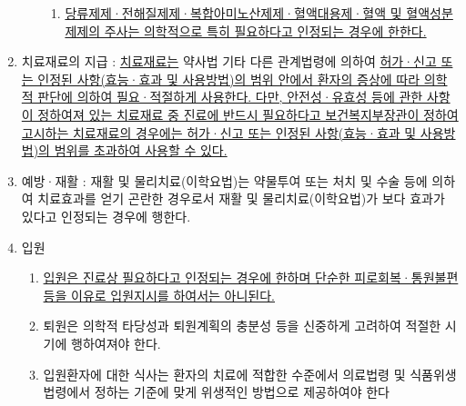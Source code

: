 \begin{enumerate}[1.]
\begin{enumerate}[가.]
\begin{enumerate}[(1)]
		\item \uline{당류제제·전해질제제·복합아미노산제제·혈액대용제·혈액 및 혈액성분제제의 주사는 의학적으로 특히 필요하다고 인정되는 경우에 한한다.}
		\end{enumerate}
	\end{enumerate}
\item 치료재료의 지급 : 
\uline{치료재료는} 약사법 기타 다른 관계법령에 의하여 \uline{허가·신고 또는 인정된 사항(효능·효과 및 사용방법)의 범위 안에서 환자의 증상에 따라 의학적 판단에 의하여 필요·적절하게 사용한다. 다만, 안전성·유효성 등에 관한 사항이 정하여져 있는 치료재료 중 진료에 반드시 필요하다고 보건복지부장관이 정하여 고시하는 치료재료의 경우에는 허가·신고 또는 인정된 사항(효능·효과 및 사용방법)의 범위를 초과하여 사용할 수 있다.}
\item 예방·재활 : 
재활 및 물리치료(이학요법)는 약물투여 또는 처치 및 수술 등에 의하여 치료효과를 얻기 곤란한 경우로서 재활 및 물리치료(이학요법)가 보다 효과가 있다고 인정되는 경우에 행한다.
\item 입원
	\begin{enumerate}[가.]\tightlist
	\item \uline{입원은 진료상 필요하다고 인정되는 경우에 한하며 단순한 피로회복·통원불편 등을 이유로 입원지시를 하여서는 아니된다.}
	\item 퇴원은 의학적 타당성과 퇴원계획의 충분성 등을 신중하게 고려하여 적절한 시기에 행하여져야 한다.
	\item 입원환자에 대한 식사는 환자의 치료에 적합한 수준에서 의료법령 및 식품위생법령에서 정하는 기준에 맞게 위생적인 방법으로 제공하여야 한다
	\end{enumerate}
\end{enumerate}

